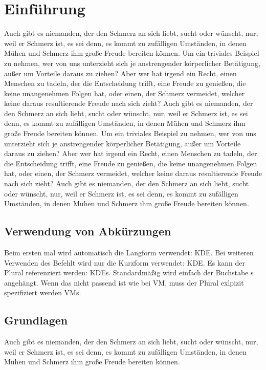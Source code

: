 \documentclass[12pt]{report}
\begin{document}
\chapter{Einführung}
Auch gibt es niemanden, der den Schmerz an sich liebt, sucht oder wünscht, nur, weil er Schmerz ist,
es sei denn, es kommt zu zufälligen Umständen, in denen Mühen und Schmerz ihm große Freude bereiten
können. Um ein triviales Beispiel zu nehmen, wer von uns unterzieht sich je anstrengender körperlicher
Betätigung, außer um Vorteile daraus zu ziehen? Aber wer hat irgend ein Recht, einen Menschen zu
tadeln, der die Entscheidung trifft, eine Freude zu genießen, die keine unangenehmen Folgen hat,
oder einen, der Schmerz vermeidet, welcher keine daraus resultierende Freude nach sich zieht?
Auch gibt es niemanden, der den Schmerz an sich liebt, sucht oder wünscht, nur, weil er Schmerz ist,
es sei denn, es kommt zu zufälligen Umständen, in denen Mühen und Schmerz ihm große Freude bereiten
können. Um ein triviales Beispiel zu nehmen, wer von uns unterzieht sich je anstrengender körperlicher
Betätigung, außer um Vorteile daraus zu ziehen? Aber wer hat irgend ein Recht, einen Menschen zu
tadeln, der die Entscheidung trifft, eine Freude zu genießen, die keine unangenehmen Folgen hat,
oder einen, der Schmerz vermeidet, welcher keine daraus resultierende Freude nach sich zieht? Auch
gibt es niemanden, der den Schmerz an sich liebt, sucht oder wünscht, nur, weil er Schmerz ist, es
sei denn, es kommt zu zufälligen Umständen, in denen Mühen und Schmerz ihm große Freude bereiten
können.

\section{Verwendung von Abkürzungen}
Beim ersten mal wird automatisch die Langform verwendet: \ac{KDE}. Bei weiteren Verwenden des Befehlt wird nur die Kurzform verwendet: \ac{KDE}. Es kann der Plural referenziert werden: \acp{KDE}.
Standardmäßig wird einfach der Buchstabe s angehängt. Wenn das nicht passend ist wie bei \ac{VM}, muss der Plural exlpizit spezifiziert werden \acp{VM}.

\section{Grundlagen}
Auch gibt es niemanden, der den Schmerz an sich liebt, sucht oder wünscht, nur, weil er Schmerz ist,
es sei denn, es kommt zu zufälligen Umständen, in denen Mühen und Schmerz ihm große Freude bereiten
können.
\end{document}
